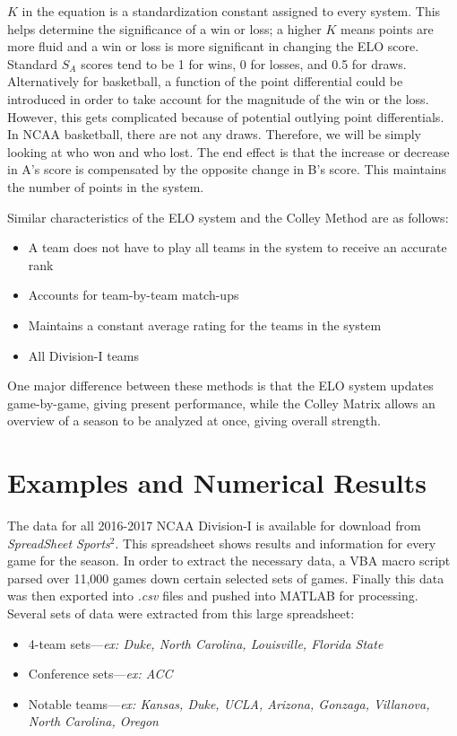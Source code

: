 \documentclass[12pt]{article}
\begin{document}
$K$ in the equation is a standardization constant assigned to every system. This helps determine the significance of a win or loss; a higher $K$ means points are more fluid and a win or loss is more significant in changing the ELO score. Standard $S_A$ scores tend to be 1 for wins, 0 for losses, and 0.5 for draws. Alternatively for basketball, a function of the point differential could be introduced in order to take account for the magnitude of the win or the loss. However, this gets complicated because of potential outlying point differentials. In NCAA basketball, there are not any draws. Therefore, we will be simply looking at who won and who lost. The end effect is that the increase or decrease in A's score is compensated by the opposite change in B's score. This maintains the number of points in the system.

Similar characteristics of the ELO system and the Colley Method are as follows:
\begin{itemize}
\item A team does not have to play all teams in the system to receive an accurate rank
\item Accounts for team-by-team match-ups
\item Maintains a constant average rating for the teams in the system
\item All Division-I teams
\end{itemize}

One major difference between these methods is that the ELO system updates game-by-game, giving present performance, while the Colley Matrix allows an overview of a season to be analyzed at once, giving overall strength.













\section{Examples and Numerical Results}
\label{sec:results}


The data for all 2016-2017 NCAA Division-I is available for download from \textit{SpreadSheet Sports}$^{2}$. This spreadsheet shows results and information for every game for the season. In order to extract the necessary data, a VBA macro script parsed over 11,000 games down certain selected sets of games. Finally this data was then exported into \textit{.csv} files and pushed into MATLAB for processing. Several sets of data were extracted from this large spreadsheet:
\begin{itemize}
\item 4-team sets---\textit{ex: Duke, North Carolina, Louisville, Florida State}
\item Conference sets---\textit{ex: ACC}
\item Notable teams---\textit{ex: Kansas, Duke, UCLA, Arizona, Gonzaga, Villanova, North Carolina, Oregon}
\end{itemize}
\end{document}
